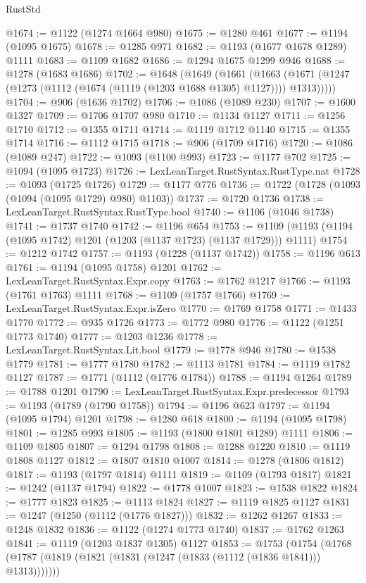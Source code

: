 \begin{lexlean}{RustStd}
\begin{coremodule}
{\begin{coremodule}
{{{{{{{{{{{{{{{{{{{{{{{{{{{{{{{@1674 := @1122 (@1274 @1664 @980)
@1675 := @1280 @461
@1677 := @1194 (@1095 @1675)
@1678 := @1285 @971
@1682 := @1193 (@1677 @1678 @1289) @1111
@1683 := @1109 @1682
@1686 := @1294 @1675 @1299 @946
@1688 := @1278 (@1683 @1686)
@1702 := @1648
    (@1649
      (@1661
        (@1663 (@1671 (@1247 (@1273 (@1112 (@1674 (@1119 (@1203 @1688 @1305) @1127)))) @1313)))))
@1704 := @906 (@1636 @1702)
@1706 := @1086 (@1089 @230)
@1707 := @1600 @1327
@1709 := @1706 @1707 @980
@1710 := @1134 @1127
@1711 := @1256 @1710
@1712 := @1355 @1711
@1714 := @1119 @1712 @1140
@1715 := @1355 @1714
@1716 := @1112 @1715
@1718 := @906 (@1709 @1716)
@1720 := @1086 (@1089 @247)
@1722 := @1093 (@1100 @993)
@1723 := @1177 @702
@1725 := @1094 (@1095 @1723)
@1726 := LexLeanTarget.RustSyntax.RustType.nat
@1728 := @1093 (@1725 @1726)
@1729 := @1177 @776
@1736 := @1722 (@1728 (@1093 (@1094 (@1095 @1729) @980) @1103))
@1737 := @1720 @1736
@1738 := LexLeanTarget.RustSyntax.RustType.bool
@1740 := @1106 (@1046 @1738)
@1741 := @1737 @1740
@1742 := @1196 @654
@1753 := @1109 (@1193 (@1194 (@1095 @1742) @1201 (@1203 (@1137 @1723) (@1137 @1729))) @1111)
@1754 := @1212 @1742
@1757 := @1193 (@1228 (@1137 @1742))
@1758 := @1196 @613
@1761 := @1194 (@1095 @1758) @1201
@1762 := LexLeanTarget.RustSyntax.Expr.copy
@1763 := @1762 @1217
@1766 := @1193 (@1761 @1763) @1111
@1768 := @1109 (@1757 @1766)
@1769 := LexLeanTarget.RustSyntax.Expr.isZero
@1770 := @1769 @1758
@1771 := @1433 @1770
@1772 := @935 @1726
@1773 := @1772 @980
@1776 := @1122 (@1251 @1773 @1740)
@1777 := @1203 @1236
@1778 := LexLeanTarget.RustSyntax.Lit.bool
@1779 := @1778 @946
@1780 := @1538 @1779
@1781 := @1777 @1780
@1782 := @1113 @1781
@1784 := @1119 @1782 @1127
@1787 := @1771 (@1112 (@1776 @1784))
@1788 := @1194 @1264
@1789 := @1788 @1201
@1790 := LexLeanTarget.RustSyntax.Expr.predecessor
@1793 := @1193 (@1789 (@1790 @1758))
@1794 := @1196 @623
@1797 := @1194 (@1095 @1794) @1201
@1798 := @1280 @618
@1800 := @1194 (@1095 @1798)
@1801 := @1285 @993
@1805 := @1193 (@1800 @1801 @1289) @1111
@1806 := @1109 @1805
@1807 := @1294 @1798
@1808 := @1288 @1220
@1810 := @1119 @1808 @1127
@1812 := @1807 @1810 @1007
@1814 := @1278 (@1806 @1812)
@1817 := @1193 (@1797 @1814) @1111
@1819 := @1109 (@1793 @1817)
@1821 := @1242 (@1137 @1794)
@1822 := @1778 @1007
@1823 := @1538 @1822
@1824 := @1777 @1823
@1825 := @1113 @1824
@1827 := @1119 @1825 @1127
@1831 := @1247 (@1250 (@1112 (@1776 @1827)))
@1832 := @1262 @1267
@1833 := @1248 @1832
@1836 := @1122 (@1274 @1773 @1740)
@1837 := @1762 @1263
@1841 := @1119 (@1203 @1837 @1305) @1127
@1853 := @1753
    (@1754 (@1768 (@1787 (@1819 (@1821 (@1831 (@1247 (@1833 (@1112 (@1836 @1841))) @1313)))))))
}}}}}}}}}}}}}}}}}}}}}}}}}}}}}}}
\end{coremodule}}
\end{coremodule}
\end{lexlean}
